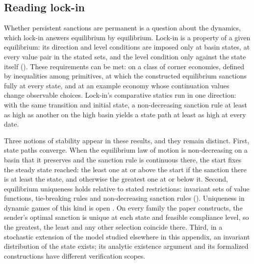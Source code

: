 \subsection{Reading lock-in}
\label{app:persistence:reading}

Whether persistent sanctions are permanent is a question about the
dynamics, which lock-in answers equilibrium by equilibrium. Lock-in is a property of a given equilibrium: its
direction and level conditions are imposed only at basin states, at every value
pair in the stated sets, and the level condition only against the state itself
(). These requirements can be met: on a class of corner
economies, defined by inequalities among primitives, at which the constructed
equilibrium sanctions fully at every state, and at an example economy whose
continuation values change observable choices.
Lock-in's comparative statics run in one direction: with the same transition and
initial state, a non-decreasing sanction rule at least as high as another on the
high basin yields a state path at least as high at every date.

Three notions of stability appear in these results, and they remain
distinct. First, state paths converge. When the equilibrium law of motion is
non-decreasing on a basin that it preserves and the sanction rule is continuous
there, the start fixes the steady state reached: the least one at or above the
start if the sanction there is at least the state, and otherwise the greatest one
at or below it. Second, equilibrium uniqueness holds relative to stated
restrictions: invariant sets of value functions, tie-breaking rules and
non-decreasing sanction rules (). Uniqueness in
dynamic games of this kind is open \citep{DoraszelskiSatterthwaite2010}. On every
family the paper constructs, the sender's optimal sanction is unique at each state
and feasible compliance level, so the greatest, the least and any other selection
coincide there. Third, in a stochastic extension of the model studied elsewhere in this
appendix, an invariant distribution of the state exists; its analytic
existence argument and its formalized constructions have different verification
scopes.

